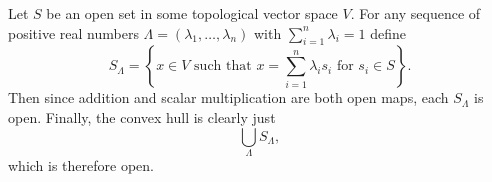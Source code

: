 \documentclass[12pt]{article}
\begin{document}
Let $S$ be an open set in some topological vector space $V$.  For any sequence of positive real numbers $\Lambda = (\lambda_1,\ldots,\lambda_n)$ with $\sum_{i=1}^n \lambda_i = 1$ define 
\[
S_\Lambda = \left\{x\in V \text{ such that } x=\sum_{i=1}^n \lambda_i s_i \text{ for }s_i\in S\right\}.
\]
Then since addition and scalar multiplication are both open maps, each $S_\Lambda$ is open.  Finally, the convex hull is clearly just 
\[
\bigcup_\Lambda S_\Lambda,
\]
which is therefore open.
\end{document}
